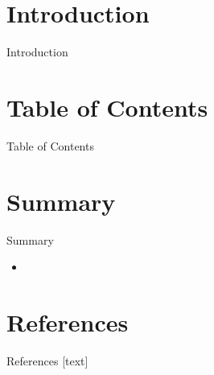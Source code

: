 \documentclass[11pt,aspectratio=1610,dvipsnames]{beamer}
\begin{document}

\section*{Introduction}
\begin{frame}{Introduction}
	\begin{tcolorbox}[colback=black!5,colframe=gray!15!black,title=\textsc{Bayes'} Theorem] 
\end{tcolorbox}
\end{frame}


\section*{Table of Contents}

\begin{frame}{Table of Contents}
	\tableofcontents
\end{frame}



\section{Summary}
\begin{frame}{Summary}
	\begin{tcolorbox}[colback=black!5,colframe=gray!15!black,title=, width=\linewidth]
		\begin{itemize}
			\item 
		\end{itemize}
	\end{tcolorbox}
\end{frame}

\section*{References}
\begin{frame}[allowframebreaks]{References}
	[text]
	
	
\end{frame}
\end{document}
